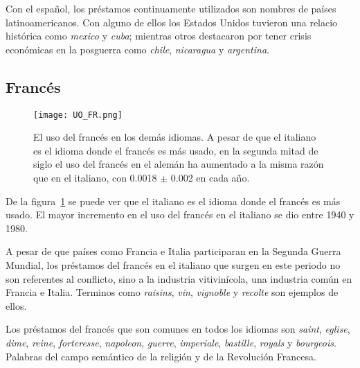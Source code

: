 Con el español, los préstamos continuamente utilizados son nombres de países latinoamericanos. Con alguno de ellos los Estados Unidos tuvieron una relacio histórica como \textit{mexico} y \textit{cuba}; mientras otros destacaron por tener crisis económicas en la posguerra como \textit{chile}, \textit{nicaragua} y \textit{argentina}.  


 





\subsection{Francés} %

\begin{figure}[h!]
	\centering
	\texttt{[image: UO\_FR.png]}
	\caption{El uso del francés en los demás idiomas. A pesar de que el italiano es el idioma donde el francés es más usado,  en la segunda mitad de siglo el uso del francés en el alemán ha aumentado a la misma razón que en el italiano, con 0.0018 $\pm$ 0.002 en cada año.}
	\label{fig.UO_FR}
\end{figure}

De la figura~\ref{fig.UO_FR} se puede ver que el italiano es el idioma donde el francés es más usado. El mayor incremento en el uso del francés en el italiano se dio entre 1940 y 1980. 

A pesar de que países como Francia e Italia  participaran en la Segunda Guerra Mundial,  los préstamos del francés en el italiano que surgen en este periodo no son referentes al conflicto, sino a la industria vitivinícola, una industria común en Francia e Italia. Terminos como \textit{raisins}, \textit{vin}, \textit{vignoble} y \textit{recolte} son ejemplos de ellos. 

Los préstamos del francés que son comunes en todos los idiomas son   \textit{saint}, \textit{eglise}, \textit{dime}, \textit{reine}, \textit{forteresse}, \textit{napoleon}, \textit{guerre}, \textit{imperiale}, \textit{bastille}, \textit{royals} y \textit{bourgeois}. Palabras  del campo semántico de la religión y de la Revolución Francesa.


